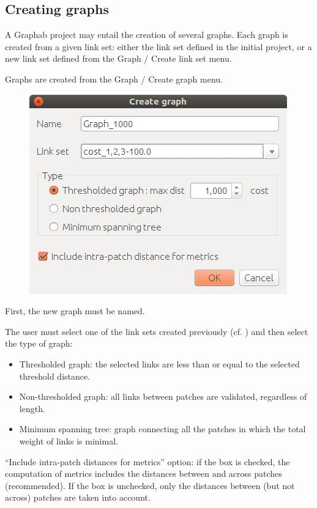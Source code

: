 \documentclass{article}
\begin{document}
\subsection{Creating graphs}

A Graphab project may entail the creation of several graphs. Each graph is created from a given link set: either the link set defined in the initial project, or a new link set defined from the Graph / Create link set menu.

Graphs are created from the Graph / Create graph menu. 

\begin{figure}[H]
	\includegraphics[scale=0.5]{img/manual-en_graph.png}
\end{figure}
	
First, the new graph must be named.

The user must select one of the link sets created previously (cf. ) and then select the type of graph:
\begin{itemize}
	\item Thresholded graph: the selected links are less than or equal to the selected threshold distance.
	\item Non-thresholded graph: all links between patches are validated, regardless of length.
	\item Minimum spanning tree: graph connecting all the patches in which the total weight of links is minimal.
\end{itemize}

“Include intra-patch distances for metrics” option: if the box is checked, the computation of metrics includes the distances between and across patches (recommended). If the box is unchecked, only the distances between (but not across) patches are taken into account.
\end{document}
